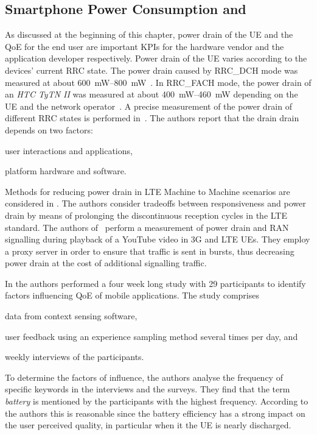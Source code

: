 \subsection{Smartphone Power Consumption and }\label{sec:network:background:energy_consumption_qoe}
As discussed at the beginning of this chapter, power drain of the \gls{UE} and the \gls{QoE} for the end user are important \glspl{KPI} for the hardware vendor and the application developer respectively.
Power drain of the \gls{UE} varies according to the devices' current \gls{RRC} state.
The power drain caused by \gls{RRC_DCH} mode was measured at about \SIrange{600}{800}{\milli\watt}~\cite{Qian2011a,Qian2010a}.
In \gls{RRC_FACH} mode, the power drain of an \emph{HTC TyTN II} was measured at about \SIrange{400}{460}{\milli\watt} depending on the \gls{UE} and the network operator~\cite{Qian2010a}.
A precise measurement of the power drain of different \gls{RRC} states is performed in~\cite{Qian2010a,Balasubramanian2009,Lee2004}. 
The authors report that the drain drain depends on two factors: 
\begin{enumerate*}
\item user interactions and applications, 
\item platform hardware and software.
\end{enumerate*}
Methods for reducing power drain in \gls{LTE} Machine to Machine scenarios are considered in \cite{Tirronen2012}.
The authors consider tradeoffs between responsiveness and power drain by means of prolonging the discontinuous reception cycles in the \gls{LTE} standard.
The authors of~\cite{Siekkinen2013} perform a measurement of power drain and \gls{RAN} signalling during playback of a YouTube video in \gls{3G} and \gls{LTE} \glspl{UE}.
They employ a proxy server in order to ensure that traffic is sent in bursts, thus decreasing power drain at the cost of additional signalling traffic.

In \cite{Ickin2012} the authors performed a four week long study with 29 participants to identify factors influencing \gls{QoE} of mobile applications.
The study comprises
\begin{enumerate*}
\item data from context sensing software,
\item user feedback using an experience sampling method several times per day, and
\item weekly interviews of the participants.
\end{enumerate*}
To determine the factors of influence, the authors analyse the frequency of specific keywords in the interviews and the surveys.
They find that the term \emph{battery} is mentioned by the participants with the highest frequency.
According to the authors this is reasonable since the battery efficiency has a strong impact on the user perceived quality, in particular when it the \gls{UE} is nearly discharged.